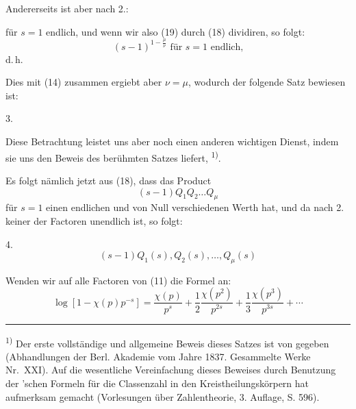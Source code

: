 Andererseits ist aber nach 2.:


für $s = 1$ endlich, und wenn wir also (19) durch (18) dividiren, so folgt:
\[
(s-1)^{1-\frac{\mu}{\nu}} \text{ für } s = 1 \text{ endlich,}
\]
d.\,h.


Dies mit (14) zusammen ergiebt aber $\nu = \mu$, wodurch der folgende Satz bewiesen ist:

3. 

Diese Betrachtung leistet uns aber noch einen anderen wichtigen Dienst, indem sie uns den Beweis des berühmten Satzes liefert, \textsuperscript{1)}.

Es folgt nämlich jetzt aus (18), dass das Product
\[
(s-1) Q_1 Q_2 \ldots Q_\mu
\]
für $s = 1$ einen endlichen und von Null verschiedenen Werth hat, und da nach 2. keiner der Factoren unendlich ist, so folgt:

4. 
\[
(s-1) Q_1(s), Q_2(s), \ldots, Q_\mu(s)
\]

Wenden wir auf alle Factoren von (11) die Formel an:
\[
\log \left[1 - \chi(p) p^{-s}\right] = \frac{\chi(p)}{p^s} + \frac{1}{2} \frac{\chi(p^2)}{p^{2s}} + \frac{1}{3} \frac{\chi(p^3)}{p^{3s}} + \cdots %
\]

\noindent\rule{4cm}{0.4pt}

\textsuperscript{1)} Der erste vollständige und allgemeine Beweis dieses Satzes ist von  gegeben (Abhandlungen der Berl. Akademie vom Jahre 1837. Gesammelte Werke Nr.\ XXI). Auf die wesentliche Vereinfachung dieses Beweises durch Benutzung der 'schen Formeln für die Classenzahl in den Kreistheilungskörpern hat  aufmerksam gemacht (Vorlesungen über Zahlentheorie, 3. Auflage, S. 596).
